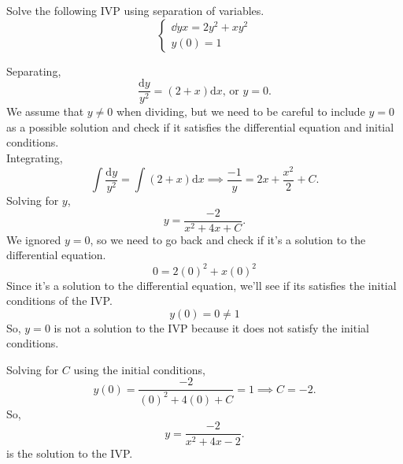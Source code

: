 \begin{example}
	Solve the following IVP using separation of variables.
	\begin{equation*}
		\begin{cases}
			\dd{y}{x} = 2y^2 + xy^2 \\
			y(0) = 1
		\end{cases}
	\end{equation*}
\end{example}
\noindent
Separating,
\begin{equation*}
	\frac{\mathrm{d}y}{y^2} = \left(2 + x\right) \mathrm{d}x \text{, or } y = 0.
\end{equation*}
We assume that $y \neq 0$ when dividing, but we need to be careful to include $y = 0$ as a possible solution and check if it satisfies the differential equation and initial conditions.\\

\noindent
Integrating,
\begin{equation*}
	\int{\frac{\mathrm{d}y}{y^2}} = \int{\left(2 + x\right) \mathrm{d}x} \implies \frac{-1}{y} = 2x + \frac{x^2}{2} + C.
\end{equation*}
Solving for $y$,
\begin{equation*}
	y = \frac{-2}{x^2 + 4x + C}.
\end{equation*}
We ignored $y = 0$, so we need to go back and check if it's a solution to the differential equation.
\begin{equation*}
	0 = 2(0)^2 + x(0)^2
\end{equation*}
Since it's a solution to the differential equation, we'll see if its satisfies the initial conditions of the IVP.
\begin{equation*}
	y(0) = 0 \neq 1
\end{equation*}
So, $y = 0$ is not a solution to the IVP because it does not satisfy the initial conditions.

\noindent
Solving for $C$ using the initial conditions,
\begin{equation*}
	y(0) = \frac{-2}{(0)^2 + 4(0) + C} = 1 \implies C = -2.
\end{equation*}
So,
\begin{equation*}
	y = \frac{-2}{x^2 + 4x -2}.
\end{equation*}
is the solution to the IVP.